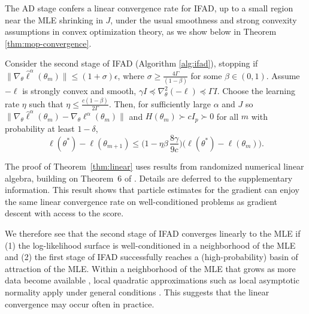 \documentclass[numsec,webpdf,modern,medium,namedate]{oup-authoring-template}
\newcommand\arxiv[2]{#2} %
\theoremstyle{thmstyleone}%
\theoremstyle{thmstyletwo}%
\theoremstyle{thmstylethree}%
\begin{document}
The AD stage confers a linear convergence rate for IFAD, up to a small region near the MLE shrinking in $J$, under the usual smoothness and strong convexity assumptions in convex optimization theory, as we show below in Theorem \ref{thm:mop-convergence}.

\begin{thm} \label{thm:linear}
    
Consider the second stage of IFAD (Algorithm \ref{alg:ifad}), stopping if $\|\nabla_\theta \hat\ell^\alpha(\theta_m)\| \leq (1+\sigma) \epsilon$, where $\sigma \geq \frac{4 \Gamma}{(1-\beta)}$ for some $\beta \in (0,1)$. Assume $-\ell$ is strongly convex and smooth, $\gamma I \preceq \nabla_\theta^2 (-\ell) \preceq \Gamma I$. Choose the learning rate $\eta$ such that $\eta \leq \frac{c(1-\beta)}{2\Gamma}$. Then, for sufficiently large $\alpha$ and $J$ so $\|\nabla_\theta \hat\ell^\alpha(\theta_m) - \nabla_\theta\ell^\alpha(\theta_m)\|$ and $H(\theta_m) \succ cI_p \succ 0$ for all $m$ with probability at least $1-\delta$,
\arxiv{}{\vspace*{-2mm}}
$$
\ell(\theta^*) - \ell(\theta_{m+1}) \leq \Big(1-\eta\beta\, \frac{8\gamma}{9c}\Big)\big(\ell(\theta^*)-\ell(\theta_m)\big).
$$
\label{thm:mop-convergence}
\end{thm}
\arxiv{}{\vspace*{-7mm}}
The proof of Theorem~\ref{thm:linear} uses results from randomized numerical linear algebra, building on Theorem~6 of \cite{mahoney16}. 
Details are deferred to \arxiv{Appendix~\ref{appendix:convergence}}{the supplementary information}. 
This result shows that particle estimates for the gradient can enjoy the same linear convergence rate on well-conditioned problems as gradient descent with access to the score. 

We therefore see that the second stage of IFAD converges linearly to the MLE if (1) the log-likelihood surface is well-conditioned in a neighborhood of the MLE and (2) the first stage of IFAD successfully reaches a (high-probability) basin of attraction of the MLE.
Within a neighborhood of the MLE that grows as more data become available \citep{ning21}, local quadratic approximations such as local asymptotic normality apply under general conditions \citep{lecam00}.
This suggests that the linear convergence may occur often in practice.

\end{document}
